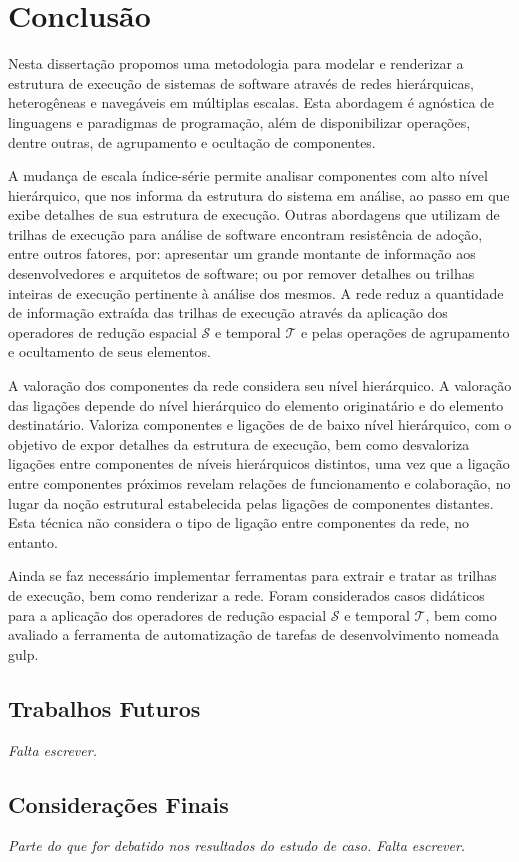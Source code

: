 
%

\chapter{Conclusão}
\label{Chapter:Conclusion}

Nesta dissertação propomos uma metodologia para modelar e renderizar a estrutura
de execução de sistemas de software através de redes hierárquicas, heterogêneas
e navegáveis em múltiplas escalas. Esta abordagem é agnóstica de linguagens e
paradigmas de programação, além de disponibilizar operações, dentre outras, de
agrupamento e ocultação de componentes.

A mudança de escala índice-série permite analisar componentes com alto nível
hierárquico, que nos informa da estrutura do sistema em análise, ao passo em que
exibe detalhes de sua estrutura de execução.
Outras abordagens que utilizam de trilhas de execução para análise de software
encontram resistência de adoção, entre outros fatores, por: apresentar um grande
montante de informação aos desenvolvedores e arquitetos de software; ou por
remover detalhes ou trilhas inteiras de execução pertinente à análise dos
mesmos.
A rede reduz a quantidade de informação extraída das trilhas de execução através
da aplicação dos operadores de redução espacial $\mathcal{S}$ e temporal
$\mathcal{T}$ e pelas operações de agrupamento e ocultamento de seus elementos.

A valoração dos componentes da rede considera seu nível hierárquico. A valoração
das ligações depende do nível hierárquico do elemento originatário e do elemento
destinatário. Valoriza componentes e ligações de de baixo nível hierárquico, com
o objetivo de expor detalhes da estrutura de execução, bem como desvaloriza
ligações entre componentes de níveis hierárquicos distintos, uma vez que a
ligação entre componentes próximos revelam relações de funcionamento e 
colaboração, no lugar da noção estrutural estabelecida pelas ligações de
componentes distantes. Esta técnica não considera o tipo de ligação entre
componentes da rede, no entanto.

Ainda se faz necessário implementar ferramentas para extrair e tratar as trilhas
de execução, bem como renderizar a rede. Foram considerados casos didáticos para
a aplicação dos operadores de redução espacial $\mathcal{S}$ e temporal
$\mathcal{T}$, bem como avaliado a ferramenta de automatização de tarefas de
desenvolvimento nomeada gulp.

\section{Trabalhos Futuros}
\label{sec:FutureWork}

\textit{Falta escrever.}


\section{Considerações Finais}
\label{sec:FinalConsiderations}

\textit{Parte do que for debatido nos resultados do estudo de caso. Falta
escrever.}
